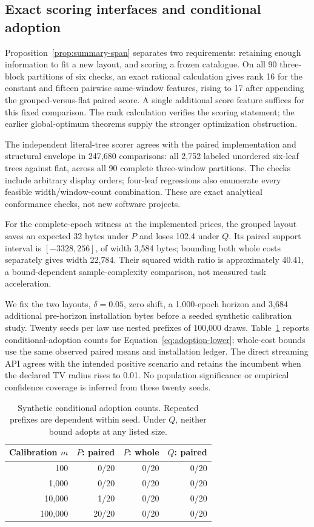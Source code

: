 \subsection{Exact scoring interfaces and conditional adoption}
Proposition~\ref{prop:summary-span} separates two requirements:
retaining enough information to fit a new layout, and scoring a frozen
catalogue. On all 90 three-block partitions of six checks, an exact
rational calculation gives rank 16 for the constant and fifteen pairwise
same-window features, rising to 17 after appending the grouped-versus-flat
paired score. A single additional score feature suffices for this fixed
comparison. The rank calculation verifies the scoring statement; the
earlier global-optimum theorems supply the stronger optimization obstruction.

The independent literal-tree scorer agrees with the paired implementation
and structural envelope in 247,680 comparisons: all 2,752 labeled unordered
six-leaf trees against flat, across all 90 complete three-window partitions.
The checks include arbitrary display orders; four-leaf regressions also
enumerate every feasible width/window-count combination. These are exact
analytical conformance checks, not new software projects.

For the complete-epoch witness at the implemented prices, the grouped
layout saves an expected 32 bytes under $P$ and loses 102.4 under $Q$.
Its paired support interval is $[-3328,256]$, of width 3,584 bytes;
bounding both whole costs separately gives width 22,784. Their squared
width ratio is approximately 40.41, a bound-dependent sample-complexity
comparison, not measured task acceleration.

We fix the two layouts, $\delta=0.05$, zero shift, a 1,000-epoch horizon
and 3,684 additional pre-horizon installation bytes before a seeded
synthetic calibration study. Twenty seeds per law use nested prefixes of
100,000 draws. Table~\ref{tab:v13-adoption} reports conditional-adoption
counts for Equation~\eqref{eq:adoption-lower}; whole-cost bounds use the
same observed paired means and installation ledger. The direct streaming
API agrees with the intended positive scenario and retains the incumbent
when the declared TV radius rises to 0.01. No population significance or
empirical confidence coverage is inferred from these twenty seeds.

\begin{table}[t]\centering\small
\caption{Synthetic conditional adoption counts. Repeated prefixes are
dependent within seed. Under $Q$, neither bound adopts at any listed size.}
\label{tab:v13-adoption}
\begin{tabular}{@{}rrrr@{}}\toprule
Calibration $m$ & $P$: paired & $P$: whole & $Q$: paired\\\midrule
100 & 0/20 & 0/20 & 0/20\\
1,000 & 0/20 & 0/20 & 0/20\\
10,000 & 1/20 & 0/20 & 0/20\\
100,000 & 20/20 & 0/20 & 0/20\\
\bottomrule\end{tabular}
\end{table}

